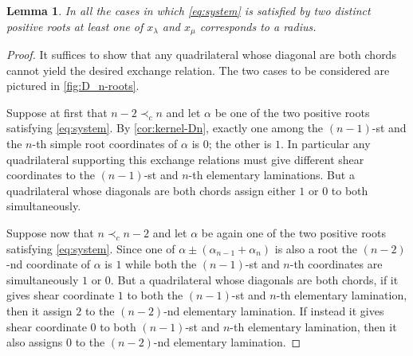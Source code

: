 \documentclass[11pt]{amsart}
\newtheorem{lemma}[theorem]{Lemma}
\numberwithin{equation}{section}
\numberwithin{figure}{section}
\begin{document}
  \begin{lemma}
    \label{lem:is-radius}
    In all the cases in which \cref{eq:system} is satisfied by two distinct positive roots at least one of $x_\lambda$ and $x_\mu$ corresponds to a radius.
  \end{lemma}
  \begin{proof}
    It suffices to show that any quadrilateral whose diagonal are both chords cannot yield the desired exchange relation.
    The two cases to be considered are pictured in \cref{fig:D_n-roots}.

    Suppose at first that $n-2 \prec_c n$ and let $\alpha$ be one of the two positive roots satisfying \cref{eq:system}.
    By \cref{cor:kernel-Dn}, exactly one among the $(n-1)$-st and the $n$-th simple root coordinates of $\alpha$ is $0$; the other is $1$.
    In particular any quadrilateral supporting this exchange relations must give different shear coordinates to the $(n-1)$-st and $n$-th elementary laminations.
    But a quadrilateral whose diagonals are both chords assign either $1$ or $0$ to both simultaneously.

    Suppose now that $n \prec_c n-2$ and let $\alpha$ be again one of the two positive roots satisfying \cref{eq:system}.
    Since one of $\alpha\pm(\alpha_{n-1}+\alpha_n)$ is also a root the $(n-2)$-nd coordinate of $\alpha$ is $1$ while both the $(n-1)$-st and $n$-th coordinates are simultaneously $1$ or $0$.
    But a quadrilateral whose diagonals are both chords, if it gives shear coordinate $1$ to both the $(n-1)$-st and $n$-th elementary lamination, then it assign $2$ to the $(n-2)$-nd elementary lamination.
    If instead it gives shear coordinate $0$ to both $(n-1)$-st and $n$-th elementary lamination, then it also assigns $0$ to the $(n-2)$-nd elementary lamination.
  \end{proof}
\end{document}
